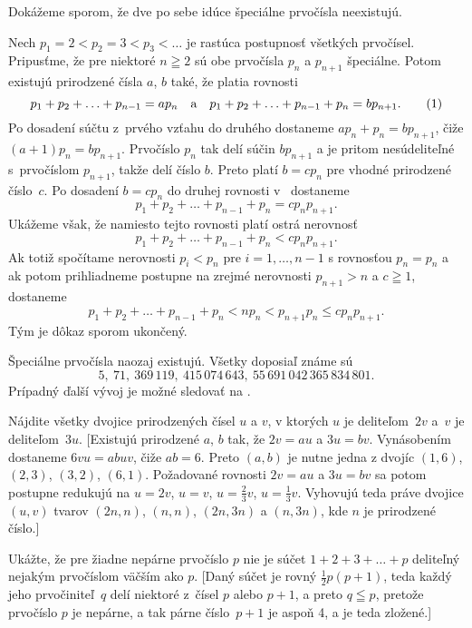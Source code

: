 {%
Dokážeme sporom, že dve po sebe idúce špeciálne prvočísla neexistujú.

Nech $p_1=2<p_2=3<p_3<\dots$ je rastúca postupnosť
všetkých prvočísel. Pripusťme, že pre niektoré $n\geqq2$ sú obe prvočísla
$p_n$ a $p_{n+1}$ špeciálne. Potom existujú prirodzené čísla $a$, $b$
také, že platia rovnosti
$$
p_1+p_2+\ldots+p_{n-1}=ap_n\quad\hbox{a}\quad
p_1+p_2+\ldots+p_{n-1}+p_{n}=bp_{n+1}.
\tag1
$$
Po dosadení súčtu z~prvého vzťahu do druhého dostaneme
$ap_n+p_{n}=bp_{n+1}$, čiže ${(a+1)}p_{n}=bp_{n+1}$.
Prvočíslo $p_{n}$ tak delí súčin
$bp_{n+1}$ a je pritom nesúdeliteľné s~prvočíslom $p_{n+1}$,
takže delí číslo $b$. Preto platí $b=cp_n$
pre vhodné prirodzené číslo~$c$. Po dosadení $b=cp_n$
do druhej rovnosti v~ dostaneme
$$
p_1+p_2+\ldots+p_{n-1}+p_{n}=cp_np_{n+1}.
$$
Ukážeme však, že namiesto tejto rovnosti platí ostrá nerovnosť
$$
p_1+p_2+\ldots+p_{n-1}+p_{n}<cp_np_{n+1}.
$$
Ak totiž spočítame nerovnosti $p_i<p_n$ pre $i=1,\dots,n-1$ s
rovnosťou $p_n=p_n$ a ak potom prihliadneme postupne
na zrejmé nerovnosti $p_{n+1}>n$ a $c\geqq1$, dostaneme
$$
p_1+p_2+\ldots+p_{n-1}+p_{n}<np_n<p_{n+1}p_n\leq cp_np_{n+1}.
$$
Tým je dôkaz sporom ukončený.

\poznamka
Špeciálne prvočísla naozaj existujú. Všetky doposiaľ známe sú
$$
5,\ 71,\ 369\,119,\ 415\,074\,643,\ 55\,691\,042\,365\,834\,801.
$$
Prípadný ďalší vývoj je možné sledovať na .



Nájdite všetky dvojice prirodzených čísel $u$ a $v$,
v ktorých $u$ je deliteľom~$2v$ a~$v$ je deliteľom~$3u$.
[Existujú prirodzené $a$, $b$ tak, že $2v=au$ a $3u=bv$.
Vynásobením dostaneme $6vu=abuv$, čiže $ab=6$.
Preto $(a,b)$ je nutne jedna z dvojíc $(1,6)$, $(2,3)$, $(3,2)$,
$(6,1)$. Požadované rovnosti $2v=au$ a $3u=bv$ sa potom postupne
redukujú na $u=2v$, $u=v$, $u=\frac23v$, $u=\frac13v$. Vyhovujú
teda práve dvojice $(u,v)$ tvarov $(2n,n)$, $(n,n)$, $(2n,3n)$ a
$(n,3n)$, kde $n$ je prirodzené číslo.]

Ukážte, že pre žiadne nepárne prvočíslo $p$ nie je súčet
$1+2+3+\ldots+p$ deliteľný nejakým prvočíslom
väčším ako $p$.
[Daný súčet je rovný $\frac12 p(p+1)$, teda
každý jeho prvočiniteľ~$q$ delí niektoré z~čísel $p$ alebo $p+1$,
a preto $q\leqq p$, pretože prvočíslo $p$ je nepárne, a tak
párne číslo~$p+1$ je aspoň 4, a je teda zložené.]

}
